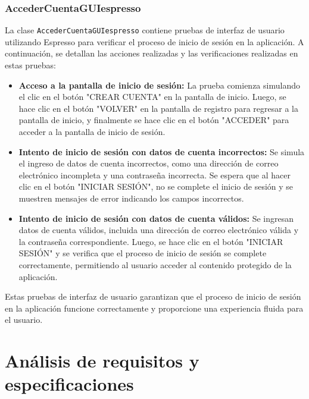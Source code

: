 \documentclass{article}
\begin{document}
\subsubsection{AccederCuentaGUIespresso}

La clase \texttt{AccederCuentaGUIespresso} contiene pruebas de interfaz de usuario utilizando Espresso para verificar el proceso de inicio de sesión en la aplicación. A continuación, se detallan las acciones realizadas y las verificaciones realizadas en estas pruebas:

\begin{itemize}
    \item \textbf{Acceso a la pantalla de inicio de sesión:} La prueba comienza simulando el clic en el botón "CREAR CUENTA" en la pantalla de inicio. Luego, se hace clic en el botón "VOLVER" en la pantalla de registro para regresar a la pantalla de inicio, y finalmente se hace clic en el botón "ACCEDER" para acceder a la pantalla de inicio de sesión.
    
    \item \textbf{Intento de inicio de sesión con datos de cuenta incorrectos:} Se simula el ingreso de datos de cuenta incorrectos, como una dirección de correo electrónico incompleta y una contraseña incorrecta. Se espera que al hacer clic en el botón "INICIAR SESIÓN", no se complete el inicio de sesión y se muestren mensajes de error indicando los campos incorrectos.
    
    \item \textbf{Intento de inicio de sesión con datos de cuenta válidos:} Se ingresan datos de cuenta válidos, incluida una dirección de correo electrónico válida y la contraseña correspondiente. Luego, se hace clic en el botón "INICIAR SESIÓN" y se verifica que el proceso de inicio de sesión se complete correctamente, permitiendo al usuario acceder al contenido protegido de la aplicación.
\end{itemize}

Estas pruebas de interfaz de usuario garantizan que el proceso de inicio de sesión en la aplicación funcione correctamente y proporcione una experiencia fluida para el usuario.









\section{Análisis de requisitos y especificaciones}
\end{document}
